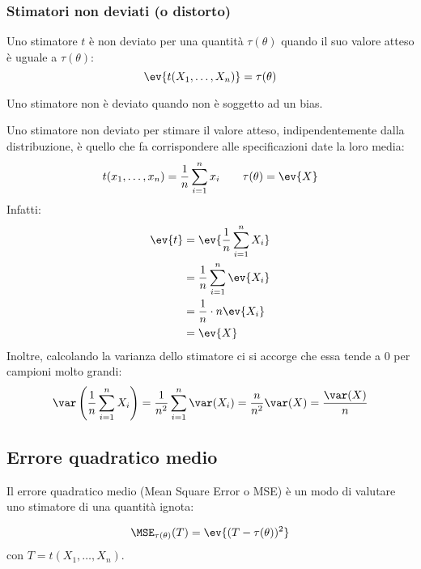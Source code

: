 \subsubsection{Stimatori non deviati (o  distorto)}
\begin{defin}
	Uno stimatore $t$ è non deviato per una quantità $\tau(\theta)$ quando il suo valore atteso è uguale a $\tau(\theta)$:
	\begin{equation*}
		\ev{t(X_1,\dots,X_n)} = \tau(\theta)
	\end{equation*}
\end{defin}
Uno stimatore non è deviato quando non è soggetto ad un bias.

\begin{examp}
	Uno stimatore non deviato per stimare il valore atteso, indipendentemente dalla distribuzione, è quello che fa corrispondere alle specificazioni date la loro media:
	\begin{equation*}
		t(x_1,\dots,x_n) = \frac{1}{n} \sum_{i=1}^n x_i \qquad \tau(\theta) = \ev{X}
	\end{equation*}
	Infatti:
	\begin{align*}
		\ev{t} & = \ev{\frac{1}{n} \sum_{i=1}^n X_i} \\
		       & = \frac{1}{n}\sum_{i=1}^n \ev{X_i}  \\
		       & = \frac{1}{n} \cdot n\ev{X_i}       \\
		       & = \ev{X}
	\end{align*}
	Inoltre, calcolando la varianza dello stimatore ci si accorge che essa tende a 0 per campioni molto grandi:
	\begin{equation*}
		\var\left(\frac{1}{n} \sum_{i=1}^n X_i\right) = \frac{1}{n^2} \sum_{i=1}^n \var(X_i) = \frac{n}{n^2}\var(X) = \frac{\var(X)}{n}
	\end{equation*}
\end{examp}


\subsection{Errore quadratico medio}
Il errore quadratico medio (Mean Square Error o MSE) è un modo di valutare uno stimatore di una quantità ignota:
\begin{defin}
	\begin{equation*}
		\MSE_{\tau(\theta)}(T) = \ev{(T-\tau(\theta))^2}
	\end{equation*}
	con $T=t(X_1,\dots,X_n)$.
\end{defin}

